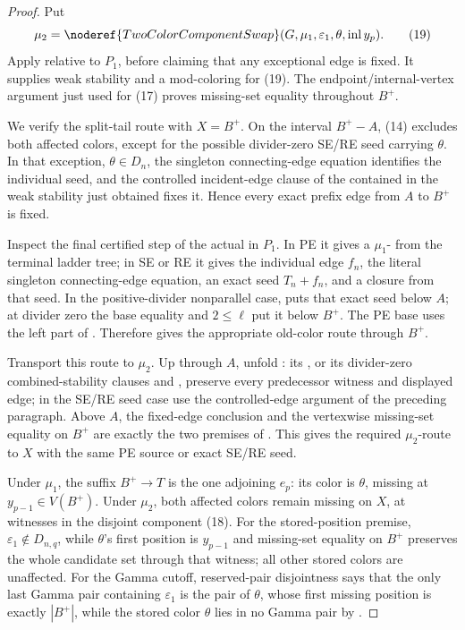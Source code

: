 \begin{proof}
Put
\[
 \mu_2=\noderef{TwoColorComponentSwap}
   (G,\mu_1,\varepsilon_1,\theta,\operatorname{inl}y_p).     \tag{19}
\]
Apply  relative to \(P_1\), before
claiming that any exceptional edge is fixed.  It supplies weak stability
and a mod-coloring for (19).  The endpoint/internal-vertex argument just
used for (17) proves missing-set equality throughout \(B^+\).

We verify the split-tail route with \(X=B^+\).  On the interval
\(B^+-A\), (14) excludes both affected colors, except for the possible
divider-zero SE/RE seed carrying \(\theta\).  In that exception,
\(\theta\in D_n\), the singleton connecting-edge equation identifies
the individual seed, and the controlled incident-edge clause of the
 contained in the weak stability just obtained
fixes it.  Hence every exact prefix edge from \(A\) to \(B^+\) is fixed.

Inspect the final certified step of the actual
 in \(P_1\).  In PE it gives a
\(\mu_1\)- from the terminal ladder tree; in
SE or RE it gives the individual edge \(f_n\), the literal singleton
connecting-edge equation, an exact
 seed \(T_n+f_n\), and a closure from
that seed.  In the positive-divider nonparallel case,
 puts that exact seed below
\(A\); at divider zero the base equality and \(2\leq\ell\) put it below
\(B^+\).  The PE base uses the left part of
.  Therefore
 gives the appropriate
old-color route through \(B^+\).

Transport this route to \(\mu_2\).  Up through \(A\), unfold
: its
, or its divider-zero combined-stability
clauses and , preserve every
predecessor witness and displayed edge; in the SE/RE seed case use the
controlled-edge argument of the preceding paragraph.  Above \(A\), the
fixed-edge conclusion and the vertexwise missing-set equality on
\(B^+\) are exactly the two premises of
.  This gives
the required \(\mu_2\)-route to \(X\) with the same PE source or exact
SE/RE seed.

Under \(\mu_1\), the suffix \(B^+\to T\) is the one
 adjoining \(e_p\): its color is
\(\theta\), missing at \(y_{p-1}\in V(B^+)\).  Under \(\mu_2\), both
affected colors remain missing on \(X\), at witnesses in the disjoint
component (18).  For the stored-position premise,
\(\varepsilon_1\notin D_{n,q}\), while \(\theta\)'s first position is
\(y_{p-1}\) and missing-set equality on \(B^+\) preserves the whole
candidate set through that witness; all other stored colors are
unaffected.  For the Gamma cutoff, reserved-pair disjointness says that
the only last Gamma pair containing \(\varepsilon_1\) is the pair of
\(\theta\), whose first missing position is exactly \(|B^+|\), while
the stored color \(\theta\) lies in no Gamma pair by
.


\end{proof}
